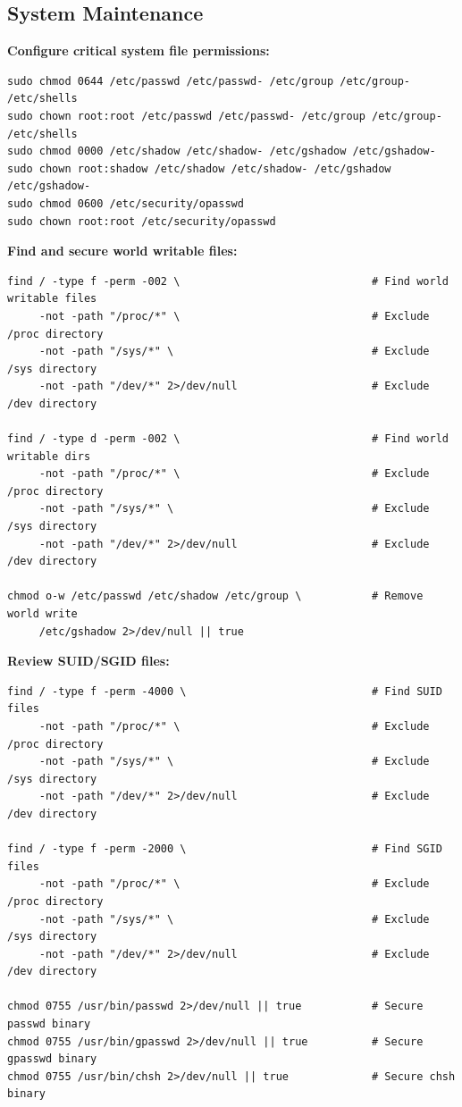 \subsection{System Maintenance}

\noindent \textbf{Configure critical system file permissions:}
\begin{verbatim}
sudo chmod 0644 /etc/passwd /etc/passwd- /etc/group /etc/group- /etc/shells
sudo chown root:root /etc/passwd /etc/passwd- /etc/group /etc/group- /etc/shells
sudo chmod 0000 /etc/shadow /etc/shadow- /etc/gshadow /etc/gshadow-
sudo chown root:shadow /etc/shadow /etc/shadow- /etc/gshadow /etc/gshadow-
sudo chmod 0600 /etc/security/opasswd
sudo chown root:root /etc/security/opasswd
\end{verbatim}

\noindent \textbf{Find and secure world writable files:}
\begin{verbatim}
find / -type f -perm -002 \                              # Find world writable files
     -not -path "/proc/*" \                              # Exclude /proc directory
     -not -path "/sys/*" \                               # Exclude /sys directory  
     -not -path "/dev/*" 2>/dev/null                     # Exclude /dev directory

find / -type d -perm -002 \                              # Find world writable dirs
     -not -path "/proc/*" \                              # Exclude /proc directory
     -not -path "/sys/*" \                               # Exclude /sys directory
     -not -path "/dev/*" 2>/dev/null                     # Exclude /dev directory
     
chmod o-w /etc/passwd /etc/shadow /etc/group \           # Remove world write
     /etc/gshadow 2>/dev/null || true
\end{verbatim}

\noindent \textbf{Review SUID/SGID files:}
\begin{verbatim}
find / -type f -perm -4000 \                             # Find SUID files
     -not -path "/proc/*" \                              # Exclude /proc directory
     -not -path "/sys/*" \                               # Exclude /sys directory
     -not -path "/dev/*" 2>/dev/null                     # Exclude /dev directory
     
find / -type f -perm -2000 \                             # Find SGID files
     -not -path "/proc/*" \                              # Exclude /proc directory
     -not -path "/sys/*" \                               # Exclude /sys directory
     -not -path "/dev/*" 2>/dev/null                     # Exclude /dev directory
     
chmod 0755 /usr/bin/passwd 2>/dev/null || true           # Secure passwd binary
chmod 0755 /usr/bin/gpasswd 2>/dev/null || true          # Secure gpasswd binary
chmod 0755 /usr/bin/chsh 2>/dev/null || true             # Secure chsh binary
\end{verbatim}

